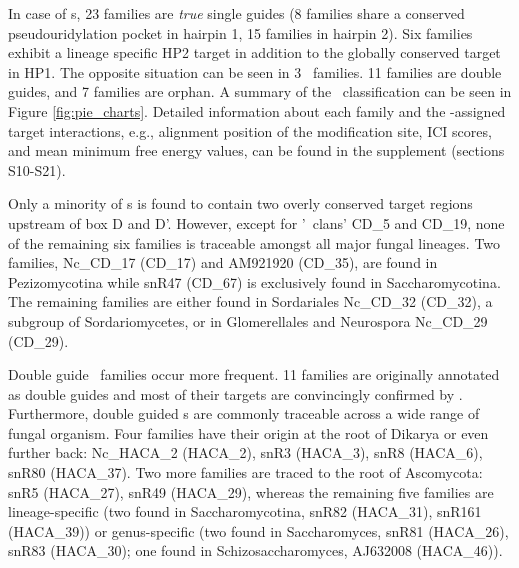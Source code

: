 
In case of \haca s, 23 families are \textit{true} single guides (8
families share a conserved pseudouridylation pocket in hairpin 1, 15
families in hairpin 2). Six families exhibit a lineage specific HP2
target in addition to the globally conserved target in HP1. The
opposite situation can be seen in 3 \haca\ families. 11 families are
double guides, and 7 families are orphan. A summary of the \sno\
classification can be seen in Figure \ref{fig:pie_charts}.  Detailed
information about each family and the \snostrip-assigned target
interactions, e.g., alignment position of the modification site, ICI
scores, and mean minimum free energy values, can be found in the
supplement (sections S10-S21).


Only a minority of \cd s is found to contain two overly conserved
target regions upstream of box D and D'. However, except for '\sno\
clans' CD\_5 and CD\_19, none of the remaining six families is
traceable amongst all major fungal lineages. Two families, Nc\_CD\_17
(CD\_17) and AM921920 (CD\_35), are found in Pezizomycotina while
snR47 (CD\_67) is exclusively found in Saccharomycotina. The remaining
families are either found in Sordariales Nc\_CD\_32 (CD\_32), a
subgroup of Sordariomycetes, or in Glomerellales and Neurospora
Nc\_CD\_29 (CD\_29).

Double guide \haca\ families occur more frequent. 11 families are
originally annotated as double guides and most of their targets are
convincingly confirmed by \snostrip. Furthermore, double guided \haca
s are commonly traceable across a wide range of fungal organism. Four
families have their origin at the root of Dikarya or even further
back: Nc\_HACA\_2 (HACA\_2), snR3 (HACA\_3), snR8 (HACA\_6), snR80
(HACA\_37). Two more families are traced to the root of Ascomycota:
snR5 (HACA\_27), snR49 (HACA\_29), whereas the remaining five families
are lineage-specific (two found in Saccharomycotina, snR82 (HACA\_31),
snR161 (HACA\_39)) or genus-specific (two found in Saccharomyces,
snR81 (HACA\_26), snR83 (HACA\_30); one found in Schizosaccharomyces,
AJ632008 (HACA\_46)).

